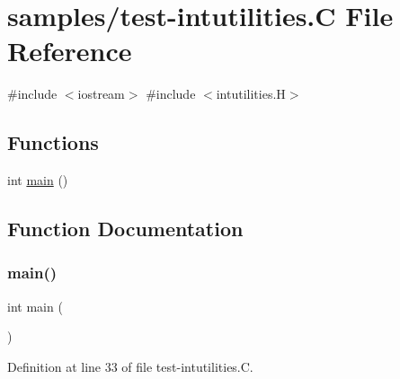 \hypertarget{test-intutilities_8_c}{}\section{samples/test-\/intutilities.C File Reference}
\label{test-intutilities_8_c}
{\ttfamily \#include $<$iostream$>$}\newline
{\ttfamily \#include $<$intutilities.\+H$>$}\newline
\subsection*{Functions}
\begin{DoxyCompactItemize}
\item 
int \hyperlink{test-intutilities_8_c_ae66f6b31b5ad750f1fe042a706a4e3d4}{main} ()
\end{DoxyCompactItemize}


\subsection{Function Documentation}
\mbox{\label{test-intutilities_8_c_ae66f6b31b5ad750f1fe042a706a4e3d4}} 
\subsubsection{\texorpdfstring{main()}{main()}}
{\footnotesize\ttfamily int main (\begin{DoxyParamCaption}{ }\end{DoxyParamCaption})}



Definition at line 33 of file test-\/intutilities.\+C.

